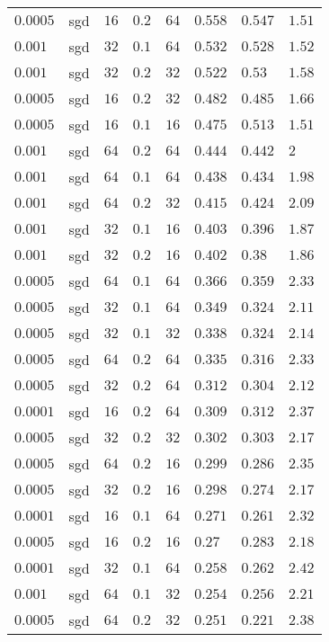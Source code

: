 \begin{table}[tbp]
\begin{tabular}{llllllll}
$0.0005$ & sgd & $16$ & $0.2$ & $64$ & $0.558$ & $0.547$ & $1.51$ \\
$0.001$ & sgd & $32$ & $0.1$ & $64$ & $0.532$ & $0.528$ & $1.52$ \\
$0.001$ & sgd & $32$ & $0.2$ & $32$ & $0.522$ & $0.53$ & $1.58$ \\
$0.0005$ & sgd & $16$ & $0.2$ & $32$ & $0.482$ & $0.485$ & $1.66$ \\
$0.0005$ & sgd & $16$ & $0.1$ & $16$ & $0.475$ & $0.513$ & $1.51$ \\
$0.001$ & sgd & $64$ & $0.2$ & $64$ & $0.444$ & $0.442$ & $2$ \\
$0.001$ & sgd & $64$ & $0.1$ & $64$ & $0.438$ & $0.434$ & $1.98$ \\
$0.001$ & sgd & $64$ & $0.2$ & $32$ & $0.415$ & $0.424$ & $2.09$ \\
$0.001$ & sgd & $32$ & $0.1$ & $16$ & $0.403$ & $0.396$ & $1.87$ \\
$0.001$ & sgd & $32$ & $0.2$ & $16$ & $0.402$ & $0.38$ & $1.86$ \\
$0.0005$ & sgd & $64$ & $0.1$ & $64$ & $0.366$ & $0.359$ & $2.33$ \\
$0.0005$ & sgd & $32$ & $0.1$ & $64$ & $0.349$ & $0.324$ & $2.11$ \\
$0.0005$ & sgd & $32$ & $0.1$ & $32$ & $0.338$ & $0.324$ & $2.14$ \\
$0.0005$ & sgd & $64$ & $0.2$ & $64$ & $0.335$ & $0.316$ & $2.33$ \\
$0.0005$ & sgd & $32$ & $0.2$ & $64$ & $0.312$ & $0.304$ & $2.12$ \\
$0.0001$ & sgd & $16$ & $0.2$ & $64$ & $0.309$ & $0.312$ & $2.37$ \\
$0.0005$ & sgd & $32$ & $0.2$ & $32$ & $0.302$ & $0.303$ & $2.17$ \\
$0.0005$ & sgd & $64$ & $0.2$ & $16$ & $0.299$ & $0.286$ & $2.35$ \\
$0.0005$ & sgd & $32$ & $0.2$ & $16$ & $0.298$ & $0.274$ & $2.17$ \\
$0.0001$ & sgd & $16$ & $0.1$ & $64$ & $0.271$ & $0.261$ & $2.32$ \\
$0.0005$ & sgd & $16$ & $0.2$ & $16$ & $0.27$ & $0.283$ & $2.18$ \\
$0.0001$ & sgd & $32$ & $0.1$ & $64$ & $0.258$ & $0.262$ & $2.42$ \\
$0.001$ & sgd & $64$ & $0.1$ & $32$ & $0.254$ & $0.256$ & $2.21$ \\
$0.0005$ & sgd & $64$ & $0.2$ & $32$ & $0.251$ & $0.221$ & $2.38$ \\

\end{tabular}
\end{table}
